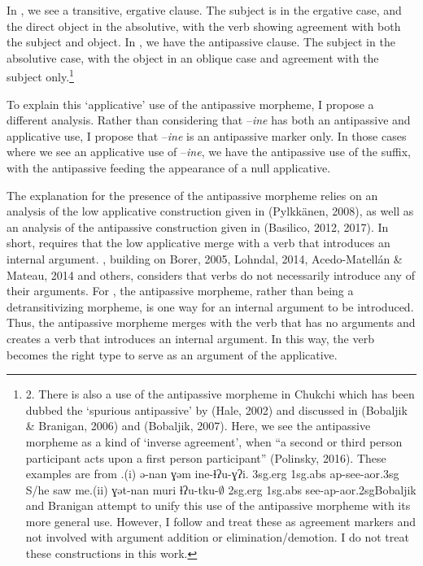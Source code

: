 \documentclass[output=paper,modfonts,nonflat]{langsci/langscibook}
\begin{document}
In , we see a transitive, ergative clause.  The subject is in the ergative case, and the direct object in the absolutive, with the verb showing agreement with both the subject and object.  In , we have the antipassive clause.  The subject in the absolutive case, with the object in an oblique case and agreement with the subject only.\footnote{2. There is also a use of the antipassive morpheme in Chukchi which has been dubbed the ‘spurious antipassive’ by (Hale, 2002) and discussed in (Bobaljik \& Branigan, 2006) and (Bobaljik, 2007).  Here, we see the antipassive morpheme as a kind of ‘inverse agreement’, when “a second or third person participant acts upon a first person participant” (Polinsky, 2016).  These examples are from \citet{Polinsky2016}.(i)  ə-nan     ɣəm     ine-ɬʔu-ɣʔi.   3\textrm{sg.erg} 1\textrm{sg.abs}     \textrm{ap}{}-see-\textrm{aor}.3\textrm{sg}   S/he saw me.(ii)    ɣət-nan   muri     ɬʔu-tku-\textrm{${\emptyset}$}    2\textrm{sg}.\textrm{erg}  1\textrm{sg.abs} see-\textrm{ap-aor}.2\textrm{sg}Bobaljik and Branigan attempt to unify this use of the antipassive morpheme with its more general use.  However, I follow \citet{Polinsky2016} and treat these as agreement markers and not involved with argument addition or elimination/demotion.  I do not treat these constructions in this work.} 

To explain this ‘applicative’ use of the antipassive morpheme, I propose a different analysis.  Rather than considering that –\textit{ine} has both an antipassive and applicative use, I propose that –\textit{ine} is an antipassive marker only. In those cases where we see an applicative use of –\textit{ine}, we have the antipassive use of the suffix, with the antipassive feeding the appearance of a null applicative.

The explanation for the presence of the antipassive morpheme relies on an analysis of the low applicative construction given in (Pylkkänen, 2008), as well as an analysis of the antipassive construction given in (Basilico, 2012, 2017).  In short, \citet{Pyllkänen2008} requires that the low applicative merge with a verb that introduces an internal argument.  \citet{Basilico2017}, building on Borer, 2005, Lohndal, 2014, Acedo-Matellán \& Mateau, 2014 and others, considers that verbs do not necessarily introduce any of their arguments.  For \citet{Basilico2017}, the antipassive morpheme, rather than being a detransitivizing morpheme, is one way for an internal argument to be introduced.  Thus, the antipassive morpheme merges with the verb that has no arguments and creates a verb that introduces an internal argument. In this way, the verb becomes the right type to serve as an argument of the applicative.
\end{document}
